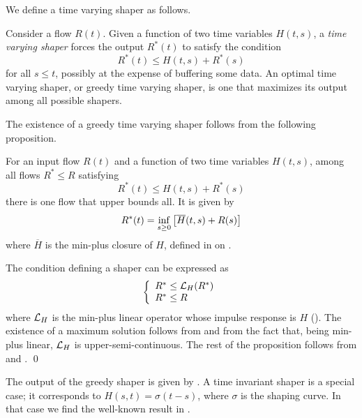 We define a time varying shaper as follows.

\begin{definition}
Consider a flow $R(t)$. Given a function of two time variables
$H(t,s)$, a \emph{time varying shaper} forces the output
$R^{*}(t)$ to satisfy the condition
$$
R^{*}(t) \leq H(t,s) +  R^* (s)
$$
for all $s \leq t$, possibly at the expense of buffering some
data. An optimal time varying shaper, or greedy time varying
shaper, is one that maximizes its output among all possible
shapers. 
\end{definition}
The existence of a greedy time varying shaper follows from the
following proposition.
\begin{proposition}
For an input flow $R(t)$ and a function of two time variables
$H(t,s)$, among all flows $R^* \leq R$ satisfying
$$R^{*}(t) \leq H(t,s)
+ R^* (s)$$ there is one flow that upper bounds all. It is given
by
\begin{equation}\mylabel{eq-vls-1}
  R^*(t)= \inf_{s \geq 0} \left[\overline{H}(t,s) + R(s)\right]
\end{equation}
where $\overline{H}$ is the min-plus closure of $H$, defined in
 on
.
\end{proposition}
\pr
The condition defining a shaper can be expressed as
 $$
 \left\{\begin{array}{l} R^* \leq \mathcal L_H ( R^* )\\
 R^* \leq R
  \end{array} \right.
  $$
where $\mathcal L_H$ is the min-plus linear operator whose impulse
response is $H$ (). The existence of a
maximum solution follows from  and from the
fact that, being min-plus linear, $\mathcal L_H$ is
upper-semi-continuous. The rest of the proposition follows from
 and .
\qed

The output of the greedy shaper is given by . A
time invariant shaper is a special case; it corresponds to $H(s,t)
= \sigma(t-s)$, where $\sigma$ is the shaping curve. In that case
we find the well-known result in .


